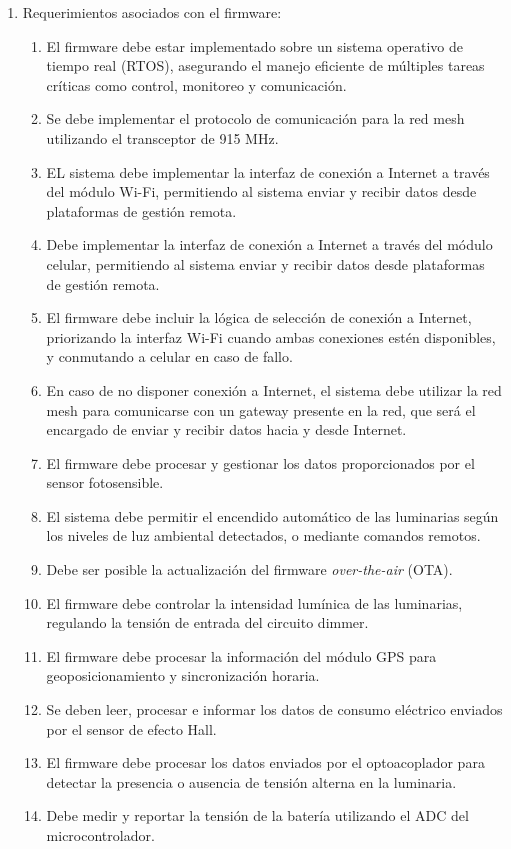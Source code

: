 \documentclass[
11pt, %
]{charter}
\begin{document}
\begin{enumerate}
	\item Requerimientos asociados con el firmware:
		\begin{enumerate}		
		\item El firmware debe estar implementado sobre un sistema operativo de tiempo real (RTOS), asegurando el manejo eficiente de múltiples tareas críticas como control, monitoreo y comunicación.
		\item Se debe implementar el protocolo de comunicación para la red mesh utilizando el transceptor de 915 MHz.
		\item EL sistema debe implementar la interfaz de conexión a Internet a través del módulo Wi-Fi, permitiendo al sistema enviar y recibir datos desde plataformas de gestión remota.
		\item Debe implementar la interfaz de conexión a Internet a través del módulo celular, permitiendo al sistema enviar y recibir datos desde plataformas de gestión remota.
		\item El firmware debe incluir la lógica de selección de conexión a Internet, priorizando la interfaz Wi-Fi cuando ambas conexiones estén disponibles, y conmutando a celular en caso de fallo.
		\item En caso de no disponer conexión a Internet, el sistema debe utilizar la red mesh para comunicarse con un gateway presente en la red, que será el encargado de enviar y recibir datos hacia y desde Internet. 
		\item El firmware debe procesar y gestionar los datos proporcionados por el sensor fotosensible.
		\item El sistema debe permitir el encendido automático de las luminarias según los niveles de luz ambiental detectados, o mediante comandos remotos.
		\item Debe ser posible la actualización del firmware \textit{over-the-air} (OTA).
		\item El firmware debe controlar la intensidad lumínica de las luminarias, regulando la tensión de entrada del circuito dimmer.
		\item El firmware debe procesar la información del módulo GPS para geoposicionamiento y sincronización horaria.
		\item Se deben leer, procesar e informar los datos de consumo eléctrico enviados por el sensor de efecto Hall.
		\item El firmware debe procesar los datos enviados por el optoacoplador para detectar la presencia o ausencia de tensión alterna en la luminaria.
		\item Debe medir y reportar la tensión de la batería utilizando el ADC del microcontrolador.
		\end{enumerate}
\end{enumerate}
\end{document}
